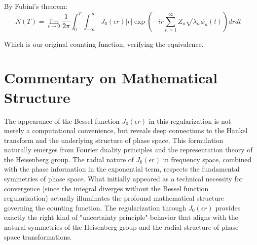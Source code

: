\documentclass{article}
\begin{document}
By Fubini's theorem:
\begin{equation}
    N(T) = \lim_{\epsilon \to 0} \frac{1}{2\pi} \int_0^T \int_{-\infty}^{\infty} J_0(\epsilon r)|r| \exp\left(-ir\sum_{n=1}^{\infty} Z_n \sqrt{\lambda_n} \phi_n(t)\right) dr dt
\end{equation}

Which is our original counting function, verifying the equivalence.

\section*{Commentary on Mathematical Structure}
The appearance of the Bessel function $J_0(\epsilon r)$ in this regularization is not merely a computational convenience, but reveals deep connections to the Hankel transform and the underlying structure of phase space. This formulation naturally emerges from Fourier duality principles and the representation theory of the Heisenberg group. The radial nature of $J_0(\epsilon r)$ in frequency space, combined with the phase information in the exponential term, respects the fundamental symmetries of phase space. What initially appeared as a technical necessity for convergence (since the integral diverges without the Bessel function regularization) actually illuminates the profound mathematical structure governing the counting function. The regularization through $J_0(\epsilon r)$ provides exactly the right kind of "uncertainty principle" behavior that aligns with the natural symmetries of the Heisenberg group and the radial structure of phase space transformations.
\end{document}
